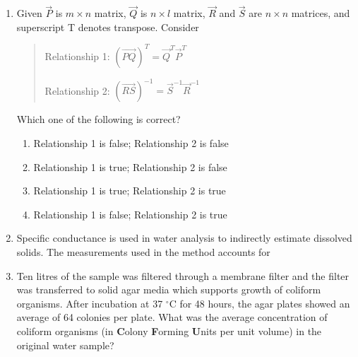 \documentclass[12pt,a4paper]{article}
\begin{document}
\begin{enumerate}
   \item Given $\vec{P}$ is $m \times n$ matrix, $\vec{Q}$ is $n \times l$ matrix, $\vec{R}$ and $\vec{S}$ are $n \times n$ matrices, and superscript T denotes transpose. Consider

         \begin{quote}
            Relationship 1: $(\vec{PQ})^T = \vec{Q}^T\vec{P}^T$

            Relationship 2: $(\vec{RS})^{-1} = \vec{S}^{-1}\vec{R}^{-1}$
         \end{quote}

         Which one of the following is correct?
         \begin{enumerate}
            \item Relationship 1 is false; Relationship 2 is false
            \item Relationship 1 is true; Relationship 2 is false
            \item Relationship 1 is true; Relationship 2 is true
            \item Relationship 1 is false; Relationship 2 is true
         \end{enumerate}

   \item Specific conductance is used in water analysis to indirectly estimate dissolved solids. The measurements used in the method accounts for
         \begin{enumerate}
         \end{enumerate}

   \item Ten litres of the sample was filtered through a membrane filter and the filter was transferred to solid agar media which supports growth of coliform organisms. After incubation at 37 $^\circ$C for 48 hours, the agar plates showed an average of 64 colonies per plate. What was the average concentration of coliform organisms (in \textbf{C}olony \textbf{F}orming \textbf{U}nits per unit volume) in the original water sample?
         \begin{enumerate}
         \end{enumerate}


\end{enumerate}
\end{document}

